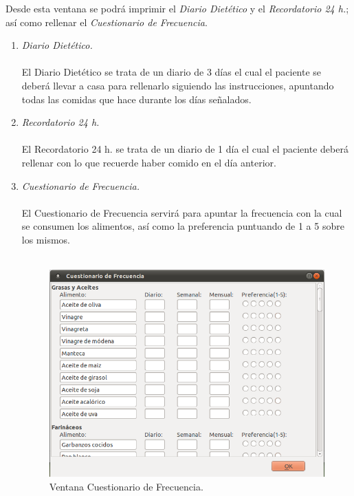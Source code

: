 \begin{enumerate}
Desde esta ventana se podrá imprimir el \textit{Diario Dietético} y el \textit{Recordatorio 24 h.}; así como rellenar el \textit{Cuestionario de Frecuencia}.
\begin{enumerate}
\item \textit{Diario Dietético.}\\\\
El Diario Dietético se trata de un diario de 3 días el cual el paciente se deberá llevar a casa para rellenarlo siguiendo las instrucciones, apuntando todas las comidas que hace durante los días señalados.
\item \textit{Recordatorio 24 h.}\\\\
El Recordatorio 24 h. se trata de un diario de 1 día el cual el paciente deberá rellenar con lo que recuerde haber comido en el día anterior.
\item \textit{Cuestionario de Frecuencia.}\\\\
El Cuestionario de Frecuencia servirá para apuntar la frecuencia con la cual se consumen los alimentos, así como la preferencia puntuando de 1 a 5 sobre los mismos.\\\\
\begin{figure}[H]
  \label{cuest_frec}
  \begin{center}
    \includegraphics[scale=0.5]{../../Image/cuestfrec.png}
  \end{center}
  \caption{Ventana Cuestionario de Frecuencia.}
\end{figure}


\end{enumerate}
\end{enumerate}
